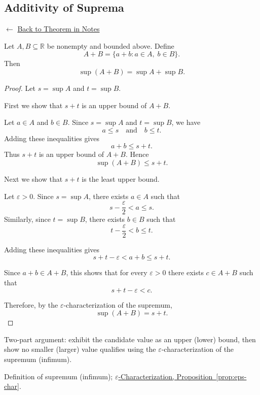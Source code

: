 
\subsection*{Additivity of Suprema}
\label{prf:additivity-of-supremums}

\begin{remark*}[Return]
$\leftarrow$ \hyperref[thm:sup-add]{Back to Theorem in Notes}
\end{remark*}

\begin{theorem*}
Let $A,B \subseteq \mathbb{R}$ be nonempty and bounded above. Define
\[
A+B=\{a+b : a\in A,\; b\in B\}.
\]
Then
\[
\sup(A+B)=\sup A+\sup B.
\]
\end{theorem*}

\begin{proof}
Let $s=\sup A$ and $t=\sup B$.

First we show that $s+t$ is an upper bound of $A+B$.

Let $a\in A$ and $b\in B$. Since $s=\sup A$ and $t=\sup B$, we have
\[
a \le s \quad \text{and} \quad b \le t.
\]
Adding these inequalities gives
\[
a+b \le s+t.
\]
Thus $s+t$ is an upper bound of $A+B$. Hence
\[
\sup(A+B) \le s+t.
\]

Next we show that $s+t$ is the least upper bound.

Let $\varepsilon>0$. Since $s=\sup A$, there exists $a\in A$ such that
\[
s-\frac{\varepsilon}{2} < a \le s.
\]
Similarly, since $t=\sup B$, there exists $b\in B$ such that
\[
t-\frac{\varepsilon}{2} < b \le t.
\]

Adding these inequalities gives
\[
s+t-\varepsilon < a+b \le s+t.
\]

Since $a+b \in A+B$, this shows that for every $\varepsilon>0$ there exists
$c\in A+B$ such that
\[
s+t-\varepsilon < c.
\]

Therefore, by the $\varepsilon$-characterization of the supremum,
\[
\sup(A+B)=s+t.
\]
\end{proof}

\begin{remark*}
Two-part argument: exhibit the candidate value as an upper (lower) bound,
then show no smaller (larger) value qualifies using the
$\varepsilon$-characterization of the supremum (infimum).
\end{remark*}

\begin{remark*}[Dependencies]
Definition of supremum (infimum); \hyperref[prop:eps-char]{$\varepsilon$-Characterization, Proposition~\ref*{prop:eps-char}}.
\end{remark*}
